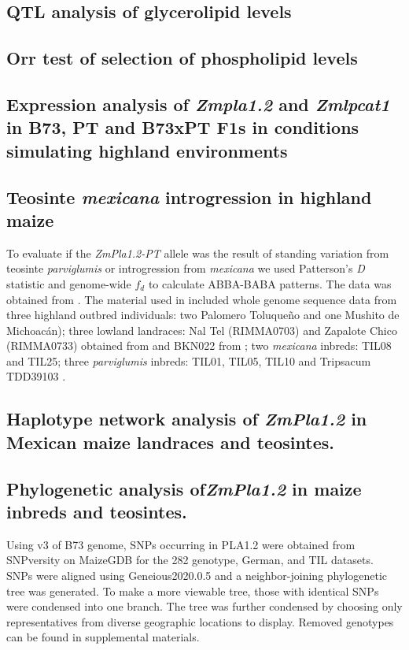\documentclass[9pt,twocolumn,twoside,lineno]{gsajnl}
\begin{document}
\subsection{QTL analysis of glycerolipid levels}

\subsection{Orr test of selection of phospholipid levels}

\subsection{Expression analysis of \textit{Zmpla1.2} and \textit{Zmlpcat1} in B73, PT and B73xPT F1s in conditions simulating highland environments}

\subsection{Teosinte \textit{mexicana} introgression in highland maize}
To evaluate if the \textit{ZmPla1.2-PT} allele was the result of standing variation from teosinte \textit{parviglumis} or introgression from \textit{mexicana} we used Patterson's \textit{D} statistic and genome-wide $f_{d}$ to calculate ABBA-BABA patterns. 
The data was obtained from \cite{Gonzalez-Segovia2019-jy}. 
The material used in \cite{Gonzalez-Segovia2019-jy} included whole genome sequence data from three highland outbred individuals: two Palomero Toluqueño and one Mushito de Michoacán); three lowland landraces: Nal Tel (RIMMA0703) and Zapalote Chico (RIMMA0733) obtained from \cite{Wang2017-bc} and  BKN022 from \cite{Bukowski2017-ng}; two \textit{mexicana} inbreds: TIL08 and TIL25; three \textit{parviglumis} inbreds: TIL01, TIL05, TIL10 and Tripsacum TDD39103 \cite{Bukowski2017-ng}. 

\subsection{Haplotype network analysis of \textit{ZmPla1.2} in Mexican maize landraces and teosintes.}

\subsection{Phylogenetic analysis of\textit{ZmPla1.2} in maize inbreds and teosintes.}
Using v3 of B73 genome, SNPs occurring in PLA1.2 were obtained from SNPversity on MaizeGDB for the 282 genotype, German, and TIL datasets. SNPs were aligned using Geneious2020.0.5 and a neighbor-joining phylogenetic tree was generated. To make a more viewable tree, those with identical SNPs were condensed into one branch. The tree was further condensed by choosing only representatives from diverse geographic locations to display. Removed genotypes can be found in supplemental materials. 
\end{document}
